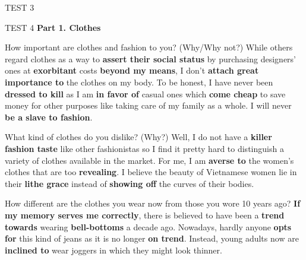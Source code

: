 \begin{glossarymc}[Cambridge 5]
\begin{test}{TEST 3}
\begin{VocabHighlights}
    \end{VocabHighlights}
    \end{test}

    \begin{test}{TEST 4}
    \noindent
    \textbf{Part 1. Clothes}
    \begin{qa}{How important are clothes and fashion to you? (Why/Why not?)}
    While others regard clothes as a way to \textbf{assert their social status} by purchasing designers' ones at \textbf{exorbitant} costs \textbf{beyond my means}, I don't \textbf{attach great importance to} the clothes on my body. To be honest, I have never been \textbf{dressed to kill} as I am \textbf{in favor of} casual ones which \textbf{come cheap} to save money for other purposes like taking care of my family as a whole. I will never \textbf{be a slave to fashion}.
    \end{qa}

    \begin{qa}{What kind of clothes do you dislike? (Why?)}
    Well, I do not have a \textbf{killer fashion taste} like other fashionistas so I find it pretty hard to distinguish a variety of clothes available in the market. For me, I am \textbf{averse to} the women's clothes that are too \textbf{revealing}. I believe the beauty of Vietnamese women lie in their \textbf{lithe grace} instead of \textbf{showing off} the curves of their bodies.
    \end{qa}

    \begin{qa}{How different are the clothes you wear now from those you wore 10 years ago?}
    \textbf{If my memory serves me correctly}, there is believed to have been a \textbf{trend towards} wearing \textbf{bell-bottoms} a decade ago. Nowadays, hardly anyone \textbf{opts for} this kind of jeans as it is no longer \textbf{on trend}. Instead, young adults now are \textbf{inclined to} wear joggers in which they might look thinner.
    \end{qa}


\end{test}
\end{glossarymc}
